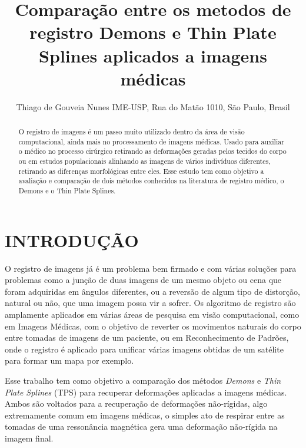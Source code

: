 \documentclass[]{spie}  %
\title{Comparação entre os metodos de registro Demons e Thin Plate Splines aplicados a imagens médicas}
\author{Thiago de Gouveia Nunes\supit{1}
\skiplinehalf
\supit{1}IME-USP, Rua do Matão 1010, São Paulo, Brasil \\
}
\begin{document}
 
\maketitle 

\begin{abstract}
O registro de imagens é um passo muito utilizado dentro da área de visão computacional, ainda mais no processamento de 
imagens médicas. Usado para auxiliar o médico no processo cirúrgico retirando as deformações geradas pelos tecidos do 
corpo ou em estudos populacionais alinhando as imagens de vários indivíduos diferentes, retirando as diferenças 
morfológicas entre eles. Esse estudo tem como objetivo a avaliação e comparação de dois métodos conhecidos na literatura 
de registro médico, o Demons e o Thin Plate Splines.
\end{abstract}



\section{INTRODUÇÃO}
\label{sec:intro}  %

O registro de imagens já é um problema bem firmado e com várias soluções para problemas\cite{brown1992survey} como a 
junção de duas imagens de um mesmo objeto ou cena que foram adquiridas em ângulos diferentes, ou a reversão de algum 
tipo de distorção, natural ou não, que uma imagem possa vir a sofrer. Os algoritmo de registro são amplamente aplicados
em várias áreas de pesquisa em visão computacional, como em Imagens Médicas, com o objetivo de reverter os
movimentos naturais do corpo entre tomadas de imagens de um paciente, ou em Reconhecimento de Padrões, onde o
registro é aplicado para unificar várias imagens obtidas de um satélite para formar um mapa por exemplo.

Esse trabalho tem como objetivo a comparação dos métodos \textit{Demons}\cite{thirion1995fast} e 
\textit{Thin Plate Splines}\cite{goshtasby1988registration} (TPS) para recuperar deformações aplicadas a imagens médicas. 
Ambos são voltados para a recuperação de deformações não-rígidas, algo extremamente comum em imagens médicas, 
o simples ato de respirar entre as tomadas de uma ressonância magnética gera uma deformação não-rígida na imagem final. 
\end{document}
